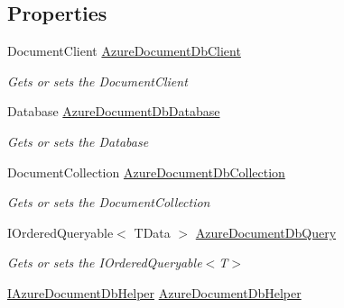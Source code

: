 \subsection*{Properties}
\begin{DoxyCompactItemize}
\item 
Document\+Client \hyperlink{classCqrs_1_1Azure_1_1DocumentDb_1_1DataStores_1_1AzureDocumentDbDataStore_a76ff9f2318e11c5c36063235a9bcdf10_a76ff9f2318e11c5c36063235a9bcdf10}{Azure\+Document\+Db\+Client}
\begin{DoxyCompactList}\small\item\em Gets or sets the Document\+Client \end{DoxyCompactList}\item 
Database \hyperlink{classCqrs_1_1Azure_1_1DocumentDb_1_1DataStores_1_1AzureDocumentDbDataStore_a9ef620e44e6f04e0720603a9b2bd8215_a9ef620e44e6f04e0720603a9b2bd8215}{Azure\+Document\+Db\+Database}
\begin{DoxyCompactList}\small\item\em Gets or sets the Database \end{DoxyCompactList}\item 
Document\+Collection \hyperlink{classCqrs_1_1Azure_1_1DocumentDb_1_1DataStores_1_1AzureDocumentDbDataStore_a281b599a47394eb90b9a5e315a537c9e_a281b599a47394eb90b9a5e315a537c9e}{Azure\+Document\+Db\+Collection}
\begin{DoxyCompactList}\small\item\em Gets or sets the Document\+Collection \end{DoxyCompactList}\item 
I\+Ordered\+Queryable$<$ T\+Data $>$ \hyperlink{classCqrs_1_1Azure_1_1DocumentDb_1_1DataStores_1_1AzureDocumentDbDataStore_a85f8d092ece684d0277642f45f550263_a85f8d092ece684d0277642f45f550263}{Azure\+Document\+Db\+Query}
\begin{DoxyCompactList}\small\item\em Gets or sets the I\+Ordered\+Queryable$<$\+T$>$ \end{DoxyCompactList}\item 
\hyperlink{interfaceCqrs_1_1Azure_1_1DocumentDb_1_1IAzureDocumentDbHelper}{I\+Azure\+Document\+Db\+Helper} \hyperlink{classCqrs_1_1Azure_1_1DocumentDb_1_1DataStores_1_1AzureDocumentDbDataStore_af6e9a6b6b5a22136e4a1f4fde85430c8_af6e9a6b6b5a22136e4a1f4fde85430c8}{Azure\+Document\+Db\+Helper}

\end{DoxyCompactItemize}
